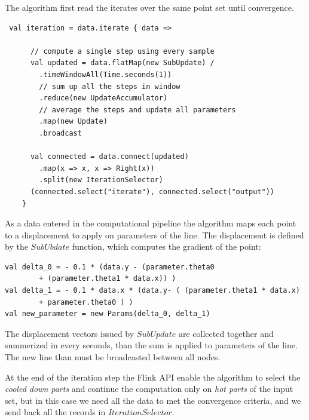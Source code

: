 The algorithm first read the iterates over the same point set until convergence. 
\begin{lstlisting}
 val iteration = data.iterate { data =>
      
      // compute a single step using every sample
      val updated = data.flatMap(new SubUpdate) /
        .timeWindowAll(Time.seconds(1))
        // sum up all the steps in window
        .reduce(new UpdateAccumulator) 
        // average the steps and update all parameters
        .map(new Update)
        .broadcast

      val connected = data.connect(updated)
        .map(x => x, x => Right(x))
        .split(new IterationSelector)
      (connected.select("iterate"), connected.select("output"))
    }
\end{lstlisting}
As a data entered in the computational pipeline the algorithm maps each point to a displacement to apply on parameters of the line. The displacement is defined by the $SubUbdate$ function, which computes the gradient of the point:
\begin{lstlisting}
val delta_0 = - 0.1 * (data.y - (parameter.theta0 
		+ (parameter.theta1 * data.x)) )
val delta_1 = - 0.1 * data.x * (data.y- ( (parameter.theta1 * data.x) 
		+ parameter.theta0 ) )
val new_parameter = new Params(delta_0, delta_1)
\end{lstlisting}
The displacement vectors issued by $SubUpdate$ are collected together and summerized in every seconds, than the sum is applied to parameters of the line. The new line than must be broadcasted between all nodes.

At the end of the iteration step the Flink API enable the algorithm to select the \textit{cooled down parts} and continue the computation only on \textit{hot parts} of the input set, but in this case we need all the data to met the convergence criteria, and we send back all the records in $IterationSelector$.    


 
      
